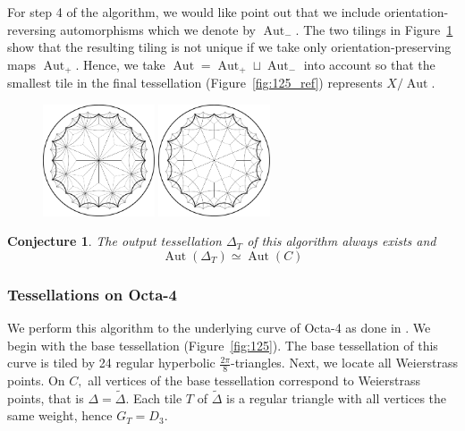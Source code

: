 \documentclass[12pt,reqno]{amsart}
\DeclareMathOperator{\Aut}{Aut}
\newtheorem{conjecture}[theorem]{Conjecture}
\theoremstyle{definition}
\theoremstyle{remark}
\begin{document}
\begin{rem}
For step 4 of the algorithm, we would like point out that we include orientation-reversing automorphisms which we denote by $\Aut_-.$ The two tilings in Figure~\ref{fig:125_hyp_i} show that the resulting tiling is not unique if we take only orientation-preserving maps $\Aut_+.$ Hence, we take $\Aut = \Aut_+ \sqcup \Aut_-$ into account so that the smallest tile in the final tessellation (Figure~\ref{fig:125_ref}) represents $X/\Aut.$

\begin{figure}[htbp] %
\centering
\begin{minipage}{.5\textwidth}
	\centering
	\includegraphics[width=1.3in]{figures/125_hyp_1.pdf}
\end{minipage}%
\begin{minipage}{.5\textwidth}
	\centering
	\includegraphics[width=1.3in]{figures/125_hyp_2.pdf}
\end{minipage}
\label{fig:125_hyp_i}
\end{figure}
\end{rem}


\begin{conjecture} \label{tessconj}
The output tessellation $\Delta_T$ of this algorithm always exists and $$\Aut(\Delta_T) \simeq \Aut(C)$$
\end{conjecture}


\subsubsection*{Tessellations on Octa-4}
We perform this algorithm to the underlying curve of Octa-4 as done in \cite{dami}. We begin with the base tessellation (Figure~\ref{fig:125}). The base tessellation of this curve is tiled by 24 regular hyperbolic $\frac{2 \pi}{8}$-triangles. Next, we locate all Weierstrass points. On $C,$ all vertices of the base tessellation correspond to Weierstrass points, that is $\Delta = \widetilde{\Delta}$. Each tile $T$ of $\widetilde{\Delta}$ is a regular triangle with all vertices the same weight, hence $G_T = D_3$. 
\end{document}
